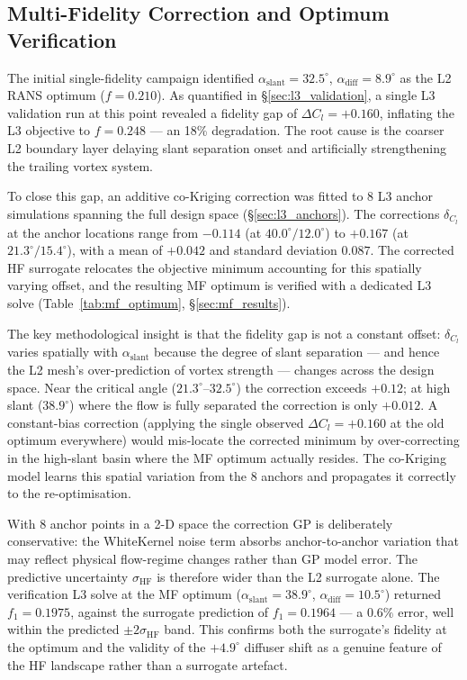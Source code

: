 \subsection{Multi-Fidelity Correction and Optimum Verification}
\label{sec:verification_gap}

The initial single-fidelity campaign identified $\alpha_\mathrm{slant}=32.5^\circ$, $\alpha_\mathrm{diff}=8.9^\circ$ as the L2 RANS optimum ($f = 0.210$). As quantified in \S\ref{sec:l3_validation}, a single L3 validation run at this point revealed a fidelity gap of $\Delta C_l = +0.160$, inflating the L3 objective to $f = 0.248$ — an 18\% degradation. The root cause is the coarser L2 boundary layer delaying slant separation onset and artificially strengthening the trailing vortex system.

To close this gap, an additive co-Kriging correction was fitted to 8 L3 anchor simulations spanning the full design space (\S\ref{sec:l3_anchors}). The corrections $\delta_{C_l}$ at the anchor locations range from $-0.114$ (at $40.0^\circ/12.0^\circ$) to $+0.167$ (at $21.3^\circ/15.4^\circ$), with a mean of $+0.042$ and standard deviation $0.087$. The corrected HF surrogate relocates the objective minimum accounting for this spatially varying offset, and the resulting MF optimum is verified with a dedicated L3 solve (Table~\ref{tab:mf_optimum}, \S\ref{sec:mf_results}).

The key methodological insight is that the fidelity gap is not a constant offset: $\delta_{C_l}$ varies spatially with $\alpha_\mathrm{slant}$ because the degree of slant separation — and hence the L2 mesh's over-prediction of vortex strength — changes across the design space. Near the critical angle ($21.3^\circ$--$32.5^\circ$) the correction exceeds $+0.12$; at high slant ($38.9^\circ$) where the flow is fully separated the correction is only $+0.012$. A constant-bias correction (applying the single observed $\Delta C_l = +0.160$ at the old optimum everywhere) would mis-locate the corrected minimum by over-correcting in the high-slant basin where the MF optimum actually resides. The co-Kriging model learns this spatial variation from the 8 anchors and propagates it correctly to the re-optimisation.

With 8 anchor points in a 2-D space the correction GP is deliberately conservative: the WhiteKernel noise term absorbs anchor-to-anchor variation that may reflect physical flow-regime changes rather than GP model error. The predictive uncertainty $\sigma_\mathrm{HF}$ is therefore wider than the L2 surrogate alone. The verification L3 solve at the MF optimum ($\alpha_\mathrm{slant}=38.9^\circ$, $\alpha_\mathrm{diff}=10.5^\circ$) returned $f_1 = 0.1975$, against the surrogate prediction of $f_1 = 0.1964$ — a $0.6\%$ error, well within the predicted $\pm 2\sigma_\mathrm{HF}$ band. This confirms both the surrogate's fidelity at the optimum and the validity of the $+4.9^\circ$ diffuser shift as a genuine feature of the HF landscape rather than a surrogate artefact.


